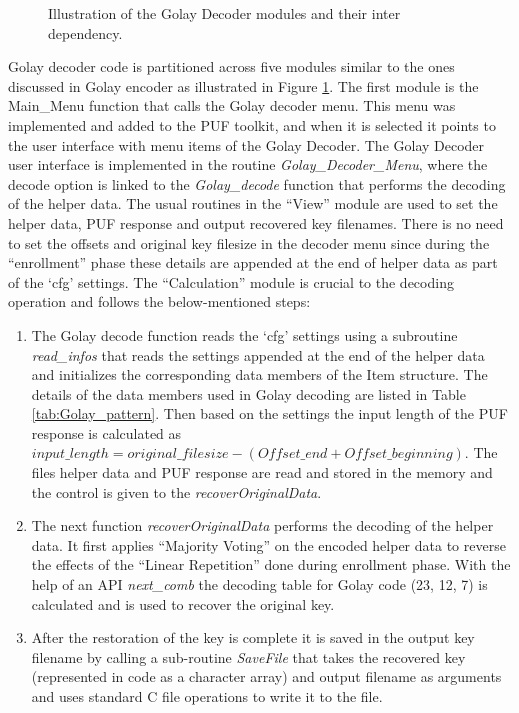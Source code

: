 	\begin{figure}[h]
	\centering
	\caption{Illustration of the Golay Decoder modules and their inter dependency.}
	\label{img:golay_decoder_fns}
	\end{figure}

	Golay decoder code is partitioned across five modules similar to the ones discussed in Golay encoder as illustrated in Figure \ref{img:golay_decoder_fns}. The first module is the Main\_Menu function that calls the Golay decoder menu. This menu was implemented and added to the PUF toolkit, and when it is selected it points to the user interface with menu items of the Golay Decoder. The Golay Decoder user interface is implemented in the routine \emph{Golay\_Decoder\_Menu}, where the decode option is linked to the \emph{Golay\_decode}
	function that performs the decoding of the helper data. The usual routines in the ``View'' module are used to set the helper data, PUF response and output recovered key filenames. There is no need to set the offsets and original key filesize in the decoder menu since during the ``enrollment'' phase these details are appended at the end of helper data as part of the `cfg' settings. The ``Calculation'' module is crucial to the decoding operation and follows the below-mentioned
	steps:
	\begin{enumerate}
		\item The Golay decode function reads the `cfg' settings using a subroutine \emph{read\_infos} that reads the settings appended at the end of the helper data and initializes the corresponding data members of the Item structure. The details of the data members used in Golay decoding are listed in Table \ref{tab:Golay_pattern}. Then based on the settings the input length of the PUF response is calculated as $input\_length = original\_filesize - (Offset\_end + Offset\_beginning)$. The files helper data and PUF response are read and stored in the memory and the control is given to the \emph{recoverOriginalData}.
		\item The next function \emph{recoverOriginalData} performs the decoding of the helper data. It first applies ``Majority Voting'' on the encoded helper data to reverse the effects of the ``Linear Repetition'' done during enrollment phase. With the help of an API \emph{next\_comb} the decoding table for Golay code (23, 12, 7) is calculated and is used to recover the original key.
		\item After the restoration of the key is complete it is saved in the output key filename by calling a
			sub-routine \emph{SaveFile} that takes the recovered key (represented in code as a character array) and output filename as arguments and uses standard C file operations to write it to the file.
	\end{enumerate}


